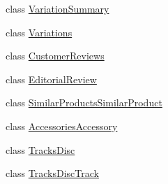 \begin{DoxyCompactItemize}
\begin{DoxyCompactList}\small\item\em \end{DoxyCompactList}\item 
class \hyperlink{class_price___comparison_1_1amazon_1_1ecs_1_1_variation_summary}{Variation\-Summary}
\begin{DoxyCompactList}\small\item\em \end{DoxyCompactList}\item 
class \hyperlink{class_price___comparison_1_1amazon_1_1ecs_1_1_variations}{Variations}
\begin{DoxyCompactList}\small\item\em \end{DoxyCompactList}\item 
class \hyperlink{class_price___comparison_1_1amazon_1_1ecs_1_1_customer_reviews}{Customer\-Reviews}
\begin{DoxyCompactList}\small\item\em \end{DoxyCompactList}\item 
class \hyperlink{class_price___comparison_1_1amazon_1_1ecs_1_1_editorial_review}{Editorial\-Review}
\begin{DoxyCompactList}\small\item\em \end{DoxyCompactList}\item 
class \hyperlink{class_price___comparison_1_1amazon_1_1ecs_1_1_similar_products_similar_product}{Similar\-Products\-Similar\-Product}
\begin{DoxyCompactList}\small\item\em \end{DoxyCompactList}\item 
class \hyperlink{class_price___comparison_1_1amazon_1_1ecs_1_1_accessories_accessory}{Accessories\-Accessory}
\begin{DoxyCompactList}\small\item\em \end{DoxyCompactList}\item 
class \hyperlink{class_price___comparison_1_1amazon_1_1ecs_1_1_tracks_disc}{Tracks\-Disc}
\begin{DoxyCompactList}\small\item\em \end{DoxyCompactList}\item 
class \hyperlink{class_price___comparison_1_1amazon_1_1ecs_1_1_tracks_disc_track}{Tracks\-Disc\-Track}

\end{DoxyCompactItemize}

